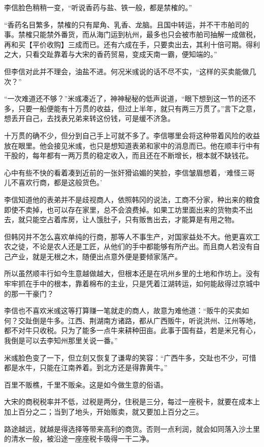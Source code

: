 李信脸色稍稍一变，“听说香药与盐、铁一般，都是禁榷的。”

“香药名目繁多，禁榷的只有犀角、乳香、龙脑。且国中转运，并不干市舶司的事。禁榷只能禁外番货，而从海门运到杭州，最多也只会被市舶司抽解一成做税，再和买【平价收购】三成而已。还有六成在手，只要卖出去，其利十倍可期。得利之大，只看交趾靠着与大宋的香药贸易，变成天南一霸，便知端的。”

但李信对此并不理会，油盐不进。何况米彧说的话不尽不实，“这样的买卖能做几次？”

“一次难道还不够？”米彧凑近了，神神秘秘的低声说道，“眼下想到这一节的还不多，只要一船便能有十万贯的收益，但过上半年，就只有两三万贯了。”言下之意，想丢开自己，去找表兄弟来转这份钱，可是缓不济急。

十万贯的确不少，但分到自己手上可就不多了。李信哪里会将这种带着风险的收益放在眼里。他会接见米彧，也只是想知道表弟和家中的消息而已。他在顺丰行中有干股的，每年都有一两万贯的稳定收入，而且还在不断增长，根本就不缺钱花。

心中有些不快的看着凑到近前的一张奸猾谄媚的笑脸，李信皱眉想着，‘难怪三哥儿不喜欢行商，都是这般货色。’

李信知道他的表弟并不是歧视商人，依照韩冈的说法，工商不分家，种出来的粮食即使不卖掉，也可以存在家里，总不会浪费掉。如果工坊里面出来的货物卖不出去，就只能空占着库房，让人饿肚子，只有贩售出去，才能算是有用之物。

但韩冈并不怎么喜欢单纯的行商，那等人不事生产，对国家益处不大。他更喜欢工农之徒，不论是农人还是工匠，从他们的手中都能够有所产出。而且商人若没有自己产业，就是无根之木，随便出点意外便是要倾家荡产。

所以虽然顺丰行如今生意越做越大，但根本还是在巩州乡里的土地和作坊上。没有牢牢抓在手中的根本，靠着棉布的主业，只是凭着江湖转运，如何能敌得过京城中的那一干豪门？

李信也不喜欢米彧这等打算赚一笔就走的商人，故意为难他道：“贩牛的买卖如何？交趾倒是牛多。江西、荆湖南方诸路，都从广西贩牛，听说洪州、江州等地，都不对牛只收税。只为了能多一点牛来耕种田亩。此事于国有益，若是米兄有心，我倒是可以去李知州那里关说一番。”

米彧脸色变了一下，但立刻又恢复了谦卑的笑容：“广西牛多，交趾也不少，可惜都是水牛，只能在江南养着。到北方还是得靠黄牛。”

百里不贩樵，千里不贩籴。这是如今做生意的俗语。

大宋的商税税率并不低，过税是两分，住税是三分，每过一座税卡，就要在成本上加上百分之二；当到了地头，开始贩卖，就又要加上百分之三。

路途越远，就越是得选择等带来高利的商货。否则一点利润，就会如同落入沙土里的清水一般，被沿途一座座税卡吸得一干二净。

